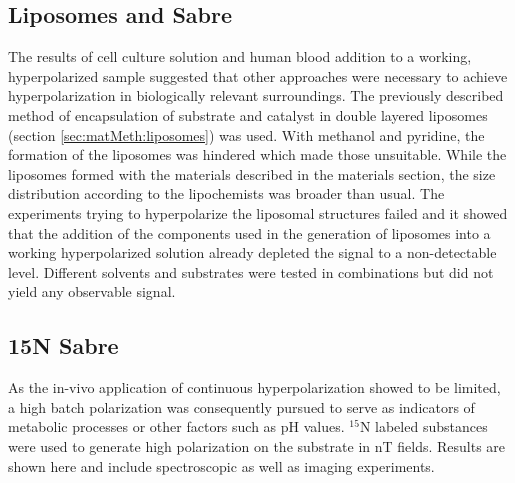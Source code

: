     \subsection{Liposomes and Sabre}
    \label{sec:results:liposomes}
    The results of cell culture solution and human blood addition to a working, hyperpolarized sample suggested that other approaches were necessary to achieve hyperpolarization in biologically relevant surroundings. The previously described method of encapsulation of substrate and catalyst in double layered liposomes (section \ref{sec:matMeth:liposomes}) was used. With methanol and pyridine, the formation of the liposomes was hindered which made those unsuitable. While the liposomes formed with the materials described in the materials section, the size distribution according to the lipochemists was broader than usual. The experiments trying to hyperpolarize the liposomal structures failed and it showed that the addition of the components used in the generation of liposomes into a working hyperpolarized solution already depleted the signal to a non-detectable level. Different solvents and substrates were tested in combinations but did not yield any observable signal.  
    \subsection{15N Sabre}
        As the in-vivo application of continuous hyperpolarization showed to be limited, a high batch polarization was consequently pursued to serve as indicators of metabolic processes or other factors such as pH values.
        $^{15}\mathrm{N}$ labeled substances were used to generate high polarization on the substrate in \si{\nano\tesla} fields. Results are shown here and include spectroscopic as well as imaging experiments.
